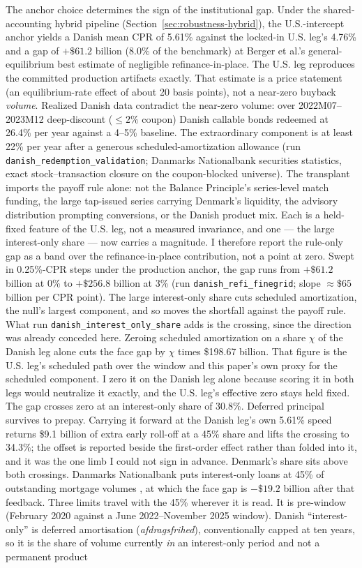 \documentclass[12pt]{article}
\begin{document}
The anchor choice determines the sign of the institutional gap. Under the shared-accounting hybrid pipeline (Section~\ref{sec:robustness-hybrid}), the U.S.-intercept anchor yields a Danish mean CPR of 5.61\% against the locked-in U.S. leg's 4.76\% and a gap of $+\$61.2$ billion (8.0\% of the benchmark) at Berger et al.'s general-equilibrium best estimate of negligible refinance-in-place. The U.S. leg reproduces the committed production artifacts exactly. That estimate is a price statement (an equilibrium-rate effect of about 20 basis points), not a near-zero buyback \emph{volume}. Realized Danish data contradict the near-zero volume: over 2022M07--2023M12 deep-discount ($\leq 2\%$ coupon) Danish callable bonds redeemed at 26.4\% per year against a 4--5\% baseline. The extraordinary component is at least 22\% per year after a generous scheduled-amortization allowance (run \texttt{danish\_redemption\_validation}; Danmarks Nationalbank securities statistics, exact stock--transaction closure on the coupon-blocked universe). The transplant imports the payoff rule alone: not the Balance Principle's series-level match funding, the large tap-issued series carrying Denmark's liquidity, the advisory distribution prompting conversions, or the Danish product mix. Each is a held-fixed feature of the U.S. leg, not a measured invariance, and one --- the large interest-only share --- now carries a magnitude. I therefore report the rule-only gap as a band over the refinance-in-place contribution, not a point at zero. Swept in 0.25\%-CPR steps under the production anchor, the gap runs from $+\$61.2$ billion at 0\% to $+\$256.8$ billion at 3\% (run \texttt{danish\_refi\_finegrid}; slope $\approx \$65$ billion per CPR point). The large interest-only share cuts scheduled amortization, the null's largest component, and so moves the shortfall against the payoff rule. What run \texttt{danish\_interest\_only\_share} adds is the crossing, since the direction was already conceded here. Zeroing scheduled amortization on a share $\chi$ of the Danish leg alone cuts the face gap by $\chi$ times \$198.67 billion. That figure is the U.S. leg's scheduled path over the window and this paper's own proxy for the scheduled component. I zero it on the Danish leg alone because scoring it in both legs would neutralize it exactly, and the U.S. leg's effective zero stays held fixed. The gap crosses zero at an interest-only share of 30.8\%. Deferred principal survives to prepay. Carrying it forward at the Danish leg's own 5.61\% speed returns \$9.1 billion of extra early roll-off at a 45\% share and lifts the crossing to 34.3\%; the offset is reported beside the first-order effect rather than folded into it, and it was the one limb I could not sign in advance. Denmark's share sits above both crossings. Danmarks Nationalbank puts interest-only loans at 45\% of outstanding mortgage volumes \citep{nationalbanken2020}, at which the face gap is $-\$19.2$ billion after that feedback. Three limits travel with the 45\% wherever it is read. It is pre-window (February 2020 against a June 2022--November 2025 window). Danish ``interest-only'' is deferred amortisation (\emph{afdragsfrihed}), conventionally capped at ten years, so it is the share of volume currently \emph{in} an interest-only period and not a permanent product 
\end{document}
